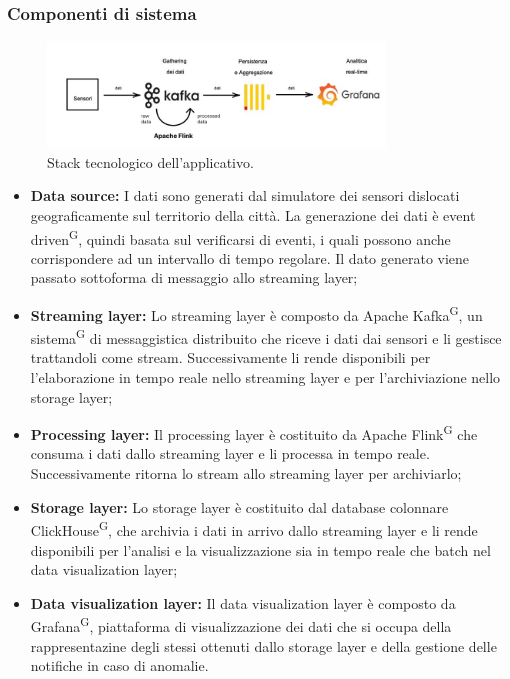 \documentclass[8pt]{article}
\newcommand{\glossterm}[1]{#1\textsuperscript{G}} %
\begin{document}
\subsubsection{Componenti di sistema}
\begin{figure}[h!]
    \centering
    \includegraphics[width=0.8\textwidth]{images_st/stack.jpg}
    \caption{Stack tecnologico dell'applicativo.}
    \label{fig:Stack tecnologico dell'applicativo}
\end{figure}
\begin{itemize}
    \item \textbf{Data source:} I dati sono generati dal simulatore dei sensori dislocati geograficamente sul territorio della città. La generazione dei dati è \glossterm{event driven}, quindi basata sul verificarsi di eventi, i quali possono anche corrispondere ad un intervallo di tempo regolare. Il dato generato viene passato sottoforma di messaggio allo streaming layer; 
    \item \textbf{Streaming layer:} Lo streaming layer è composto da Apache \glossterm{Kafka}, un \glossterm{sistema} di messaggistica distribuito che riceve i dati dai sensori e li gestisce trattandoli come stream. Successivamente li rende disponibili per l’elaborazione in tempo reale nello streaming layer e per l'archiviazione nello storage layer; 
    \item \textbf{Processing layer:} Il processing layer è costituito da Apache \glossterm{Flink} che consuma i dati dallo streaming layer e li processa in tempo reale. Successivamente ritorna lo stream allo streaming layer per archiviarlo;
    \item \textbf{Storage layer:} Lo storage layer è costituito dal database colonnare \glossterm{ClickHouse}, che archivia i dati in arrivo dallo streaming layer e li rende disponibili per l’analisi e la visualizzazione sia in tempo reale che batch nel data visualization layer;
    \item \textbf{Data visualization layer:} Il data visualization layer è composto da \glossterm{Grafana}, piattaforma di visualizzazione dei dati che si occupa della rappresentazine degli stessi ottenuti dallo storage layer e della gestione delle notifiche in caso di anomalie.
\end{itemize}
\end{document}
